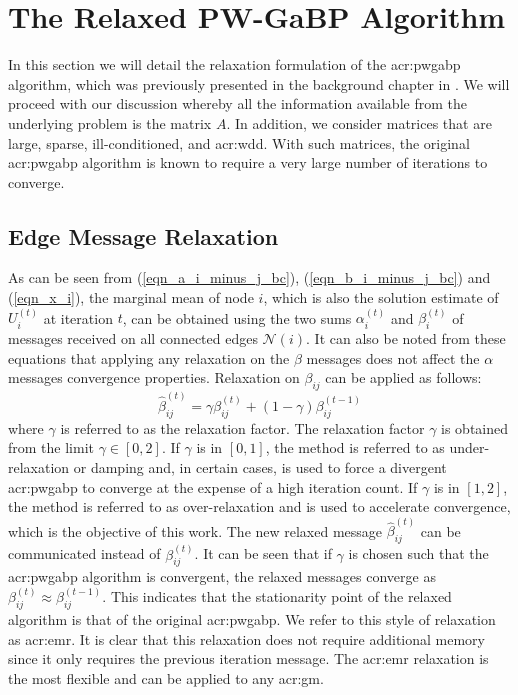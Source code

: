 \section{The Relaxed PW-GaBP Algorithm}
\label{sec:rgabp}


In this section we will detail the relaxation formulation of the \gls{acr:pwgabp} algorithm, which was previously presented in the background chapter in .
We will proceed with our discussion whereby all the information available from the underlying problem is the matrix $A$.
In addition, we consider matrices that are large, sparse, ill-conditioned, and \gls{acr:wdd}.
With such matrices, the original \gls{acr:pwgabp} algorithm is known to require a very large number of iterations to converge.


\subsection{Edge Message Relaxation}


As can be seen from (\ref{eqn_a_i_minus_j_bc}), (\ref{eqn_b_i_minus_j_bc}) and (\ref{eqn_x_i}), the marginal mean of node $i$, which is also the solution estimate of $U_i^{(t)}$ at iteration $t$, can be obtained using the two sums $\alpha_i^{(t)}$ and $\beta_i^{(t)}$ of messages received on all connected edges $\mathcal{N}(i)$.
It can also be noted from these equations that applying any relaxation on the $\beta$ messages does not affect the $\alpha$ messages convergence properties.  Relaxation on $\beta_{ij}$ can be applied as follows:
\begin{equation}
	\hat{\beta}_{ij}^{(t)} = \gamma \beta_{ij}^{(t)} + (1-\gamma)\beta_{ij}^{(t-1)}
\end{equation}
where $\gamma$ is referred to as the relaxation factor.
The relaxation factor $\gamma$ is obtained from the limit  $\gamma \in [0,2]$.
If $\gamma$ is in $[0,1]$, the method is referred to as under-relaxation or damping and, in certain cases, is used to force a divergent \gls{acr:pwgabp} to converge at the expense of a high iteration count.
If $\gamma $ is in $[1,2]$, the method is referred to as over-relaxation and is used to accelerate convergence, which is the objective of this work.  
The new relaxed message $\hat{\beta}_{ij}^{(t)}$ can be communicated instead of $\beta_{ij}^{(t)}$.
It can be seen that if $\gamma$ is chosen such that the \gls{acr:pwgabp} algorithm is convergent, the relaxed messages converge as $\beta_{ij}^{(t)} \approx \beta_{ij}^{(t-1)}$.
This indicates that the stationarity point of the relaxed algorithm is that of the original \gls{acr:pwgabp}.
We refer to this style of relaxation as \gls{acr:emr}.
It is clear that this relaxation does not require additional memory since it only requires the previous iteration message.
The \gls{acr:emr} relaxation is the most flexible and can be applied to any \gls{acr:gm}.


